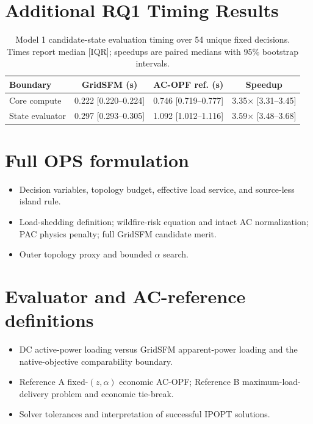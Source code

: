 \documentclass{article}
\newcommand{\draftpoint}[1]{\item \textcolor{black!70}{#1}}
\begin{document}
\newpage
\appendix
\section{Additional RQ1 Timing Results}

\begin{table}[!htbp]
    \centering
    \caption{Model 1 candidate-state evaluation timing over 54 unique fixed
    decisions. Times report median [IQR]; speedups are paired medians with
    95\% bootstrap intervals.}
    \label{tab:rq1-runtime-full}
    \small
    \begin{tabular}{lccc}
        \toprule
        Boundary & GridSFM (s) & AC-OPF ref. (s) & Speedup \\
        \midrule
        Core compute &
        0.222 [0.220--0.224] &
        0.746 [0.719--0.777] &
        3.35$\times$ [3.31--3.45] \\
        State evaluator &
        0.297 [0.293--0.305] &
        1.092 [1.012--1.116] &
        3.59$\times$ [3.48--3.68] \\
        \bottomrule
    \end{tabular}
\end{table}
\section{Full OPS formulation}
\label{app:formulation}
\begin{itemize}
    \draftpoint{Decision variables, topology budget, effective load service, and source-less island rule.}
    \draftpoint{Load-shedding definition; wildfire-risk equation and intact AC normalization; PAC physics penalty; full GridSFM candidate merit.}
    \draftpoint{Outer topology proxy and bounded $\alpha$ search.}
\end{itemize}

\section{Evaluator and AC-reference definitions}
\begin{itemize}
    \draftpoint{DC active-power loading versus GridSFM apparent-power loading and the native-objective comparability boundary.}
    \draftpoint{Reference A fixed-$(z,\alpha)$ economic AC-OPF; Reference B maximum-load-delivery problem and economic tie-break.}
    \draftpoint{Solver tolerances and interpretation of successful IPOPT solutions.}
\end{itemize}
\end{document}
